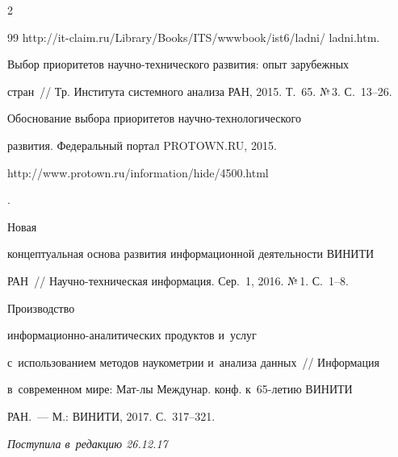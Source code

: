 \begin{multicols}{2}
{{\begin{thebibliography}{99}
{http://\linebreak it-claim.ru/Library/Books/ITS/wwwbook/ist6/ladni/ ladni.htm}. 



Выбор приоритетов на\-уч\-но-тех\-ни\-че\-ско\-го развития: опыт зарубежных 

стран~// Тр. Института системного анализа РАН, 2015. Т.~65. №\,3. С.~13--26.


Обоснование выбора приоритетов на\-уч\-но-тех\-но\-ло\-ги\-че\-ско\-го 

развития. Федеральный портал PROTOWN.RU,  2015. {\sf 

http://www.protown.ru/\linebreak information/hide/4500.html}. 


 Новая 

концептуальная основа развития информационной деятельности ВИНИТИ 

РАН~// На\-уч\-но-тех\-ни\-че\-ская информация. Сер.~1, 2016. №\,1. С.~1--8. 


 Производство  

ин\-фор\-ма\-ци\-он\-но-ана\-ли\-ти\-че\-ских продуктов и~услуг 

с~использованием методов наукометрии и~анализа данных~// Информация 

в~современном мире: Мат-лы Междунар. конф. к~65-ле\-тию ВИНИТИ  

РАН.~--- М.: ВИНИТИ, 2017. С.~317--321.

  \end{thebibliography}



 }

 }



\end{multicols}



\vspace*{-6pt}



\hfill{\small\textit{Поступила в~редакцию 26.12.17}}



